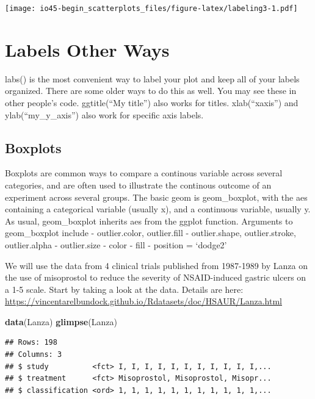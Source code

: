 \documentclass[
]{book}
\newenvironment{Shaded}{\begin{snugshade}}{\end{snugshade}}
\newcommand{\KeywordTok}[1]{\textcolor[rgb]{0.13,0.29,0.53}{\textbf{#1}}}
\newcommand{\NormalTok}[1]{#1}
\begin{document}
\texttt{[image: io45-begin\_scatterplots\_files/figure-latex/labeling3-1.pdf]}

\hypertarget{labels-other-ways}{%
\chapter{Labels Other Ways}\label{labels-other-ways}}

labs() is the most convenient way to label your plot and keep all of your labels organized. There are some older ways to do this as well. You may see these in other people's code. ggtitle(``My title'') also works for titles. xlab(``xaxis'') and ylab(``my\_y\_axis'') also work for specific axis labels.

\hypertarget{boxplots}{%
\section{Boxplots}\label{boxplots}}

Boxplots are common ways to compare a continous variable across several categories, and are often used to illustrate the continous outcome of an experiment across several groups.
The basic geom is geom\_boxplot, with the aes containing a categorical variable (usually x),
and a continuous variable, usually y. As usual, geom\_boxplot inherits aes from the ggplot function.
Arguments to geom\_boxplot include
- outlier.color, outlier.fill
- outlier.shape, outlier.stroke, outlier.alpha
- outlier.size
- color
- fill
- position = `dodge2'

We will use the data from 4 clinical trials published from 1987-1989 by Lanza on the use of misoprostol to reduce the severity of NSAID-induced gastric ulcers on a 1-5 scale.
Start by taking a look at the data.
Details are here: \url{https://vincentarelbundock.github.io/Rdatasets/doc/HSAUR/Lanza.html}

\begin{Shaded}
\begin{Highlighting}[]
\KeywordTok{data}\NormalTok{(Lanza)}
\KeywordTok{glimpse}\NormalTok{(Lanza)}
\end{Highlighting}
\end{Shaded}

\begin{verbatim}
## Rows: 198
## Columns: 3
## $ study          <fct> I, I, I, I, I, I, I, I, I, I, I,...
## $ treatment      <fct> Misoprostol, Misoprostol, Misopr...
## $ classification <ord> 1, 1, 1, 1, 1, 1, 1, 1, 1, 1, 1,...
\end{verbatim}
\end{document}
